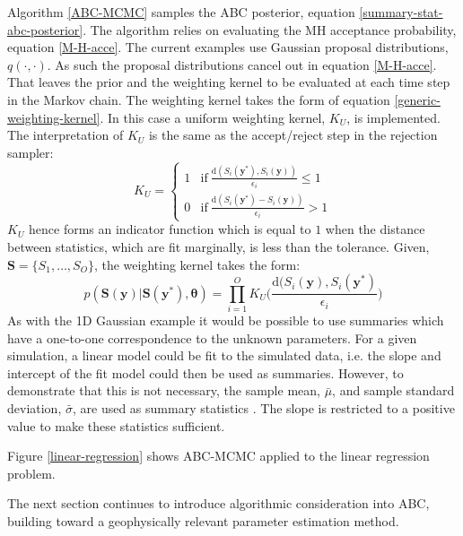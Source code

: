 Algorithm \ref{ABC-MCMC} samples the ABC posterior, equation \ref{summary-stat-abc-posterior}. The algorithm relies on evaluating the MH acceptance probability, equation \ref{M-H-acce}. The current examples use Gaussian proposal distributions, $q(\cdot,\cdot)$. As such the proposal distributions cancel out in equation \ref{M-H-acce}. That leaves the prior and the weighting kernel to be evaluated at each time step in the Markov chain. The weighting kernel takes the form of equation \ref{generic-weighting-kernel}. In this case a uniform weighting kernel, $K_U$, is implemented. The interpretation of $K_U$ is the same as the accept/reject step in the rejection sampler: 
\begin{equation}
	K_U = 
	\begin{cases}
		1 & \text{if}\ 	\frac{\text{d}(S_i(\bm{y^*}),S_i(\bm{y}))}				{\epsilon_i} \leq 1\\
		0 & \text{if}\ \frac{\text{d}(S_i(\bm{y^*}) - S_i(\bm{y}))}				{\epsilon_i} > 1
	\end{cases}
\end{equation}
$K_U$ hence forms an indicator function which is equal to $1$ when the distance between statistics, which are fit marginally, is less than the tolerance. Given, $\bm{S} = \{S_1,\dots,S_O\}$, the weighting kernel takes the form:
\begin{equation}
	p(\bm{S}(\bm{y})|\bm{S}(\bm{y^*}),\bm{\theta}) = \prod_{i = 1}^{O} K_U\Big(\frac{\text{d}(S_i(\bm{y}),S_i(\bm{y^*})}{\epsilon_i}\Big)
	\label{weight-kernel}
\end{equation}
As with the 1D Gaussian example it would be possible to use summaries which have a one-to-one correspondence to the unknown parameters. For a given simulation, a linear model could be fit to the simulated data, i.e. the slope and intercept of the fit model could then be used as summaries. However, to demonstrate that this is not necessary, the sample mean, $\bar{\mu}$, and sample standard deviation, $\bar{\sigma}$, are used as summary statistics \citep{vrugt2013toward}. The slope is restricted to a positive value to make these statistics sufficient. \par

Figure \ref{linear-regression} shows ABC-MCMC applied to the linear regression problem. \par

The next section continues to introduce algorithmic consideration into ABC, building toward a geophysically relevant parameter estimation method.\par

